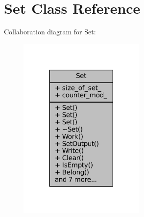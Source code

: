 \hypertarget{classSet}{}\section{Set Class Reference}
\label{classSet}


Collaboration diagram for Set\+:
\nopagebreak
\begin{figure}[H]
\begin{center}
\leavevmode
\includegraphics[width=177pt]{classSet__coll__graph}
\end{center}
\end{figure}
